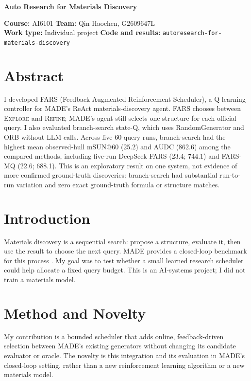 \documentclass[11pt,a4paper]{article}
\newcommand{\ProjectTitle}{Auto Research for Materials Discovery}
\newcommand{\Programme}{AI6101}
\newcommand{\TeamMembers}{Qin Haochen, G2609647L}
\begin{document}
\begin{center}
  {\LARGE\bfseries \ProjectTitle\par}
  \vspace{4pt}
\end{center}
\noindent\textbf{Course:} \Programme \hfill
\textbf{Team:} \TeamMembers\\
\textbf{Work type:} Individual project \hfill
\textbf{Code and results:} \texttt{autoresearch-for-materials-discovery}

\section*{Abstract}
I developed FARS (Feedback-Augmented Reinforcement Scheduler), a
Q-learning controller for MADE's ReAct materials-discovery agent. FARS
chooses between \textsc{Explore} and \textsc{Refine}; MADE's agent still
selects one structure for each official query. I also evaluated branch-search
state-Q, which uses RandomGenerator and ORB without LLM calls. Across five
60-query runs, branch-search had the highest mean observed-hull mSUN@60
(25.2) and AUDC (862.6) among the compared methods, including five-run
DeepSeek FARS (23.4; 744.1) and FARS-MQ (22.6; 688.1). This is an
exploratory result on one system, not evidence of more confirmed
ground-truth discoveries: branch-search had substantial run-to-run
variation and zero exact ground-truth formula or structure matches.

\section{Introduction}
Materials discovery is a sequential search: propose a structure, evaluate
it, then use the result to choose the next query. MADE provides a closed-loop
benchmark for this process \cite{made,repo}. My goal was to test whether a
small learned research scheduler could help allocate a fixed query budget.
This is an AI-systems project; I did not train a materials model.

\section{Method and Novelty}
My contribution is a bounded scheduler that adds online, feedback-driven
selection between MADE's existing generators without changing its
candidate evaluator or oracle. The novelty is this integration and its
evaluation in MADE's closed-loop setting, rather than a new reinforcement
learning algorithm or a new materials model.
\end{document}
